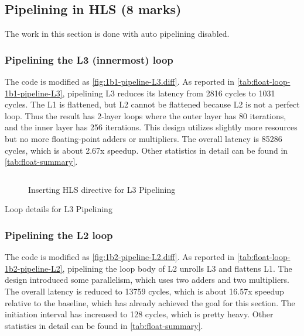 \subsection{Pipelining in HLS (8 marks)}

The work in this section is done with auto pipelining disabled.

\subsubsection{Pipelining the L3 (innermost) loop}\label{sec:1bL3}

The code is modified as \autoref{fig:1b1-pipeline-L3.diff}.
As reported in \autoref{tab:float-loop-1b1-pipeline-L3}, pipelining L3 reduces its latency from 2816 cycles to 1031 cycles.
The L1 is flattened, but L2 cannot be flattened because L2 is not a perfect loop.
Thus the result has 2-layer loops where the outer layer has 80 iterations, and the inner layer has 256 iterations.
This design utilizes slightly more resources but no more floating-point adders or multipliers.
The overall latency is 85286 cycles, which is about 2.67x speedup.
Other statistics in detail can be found in \autoref{tab:float-summary}.

\begin{figure}[ht!]
    \centering
    \inputminted[firstline=3]{diff}{program/1b1-pipeline-L3.diff}
    \caption{Inserting HLS directive for L3 Pipelining}\label{fig:1b1-pipeline-L3.diff}
\end{figure}

\begin{table}[ht!]
    \caption{Loop details for L3 Pipelining}
    \label{tab:float-loop-1b1-pipeline-L3}
    \centering
    
\end{table}

\subsubsection{Pipelining the L2 loop}\label{sec:1bL2}

The code is modified as \autoref{fig:1b2-pipeline-L2.diff}.
As reported in \autoref{tab:float-loop-1b2-pipeline-L2}, pipelining the loop body of L2 unrolls L3 and flattens L1.
The design introduced some parallelism, which uses two adders and two multipliers.
The overall latency is reduced to 13759 cycles, which is about 16.57x speedup relative to the baseline, which has already achieved the goal for this section.
The initiation interval has increased to 128 cycles, which is pretty heavy.
Other statistics in detail can be found in \autoref{tab:float-summary}.

